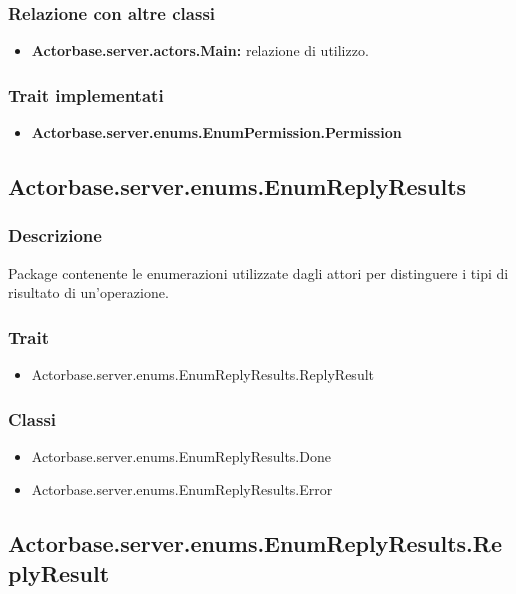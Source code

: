 \documentclass[a4paper]{article}
\begin{document}
			\subsubsection{Relazione con altre classi}
				\begin{itemize}
					\item \textbf{Actorbase.server.actors.Main:} relazione di utilizzo.
				\end{itemize}
				
			\subsubsection{Trait implementati}
				\begin{itemize}
					\item \textbf{Actorbase.server.enums.EnumPermission.Permission} 
				\end{itemize}
				
				
			\subsection{Actorbase.server.enums.EnumReplyResults}
			\subsubsection{Descrizione}
				Package contenente le enumerazioni utilizzate dagli attori per distinguere i tipi di risultato di un'operazione.
				
			\subsubsection{Trait}
				\begin{itemize}
					\item Actorbase.server.enums.EnumReplyResults.ReplyResult
				\end{itemize}
				
			\subsubsection{Classi}
			\begin{itemize}
					\item Actorbase.server.enums.EnumReplyResults.Done
					\item Actorbase.server.enums.EnumReplyResults.Error
			\end{itemize}				
				
				
		\subsection{Actorbase.server.enums.EnumReplyResults.ReplyResult}
\end{document}
